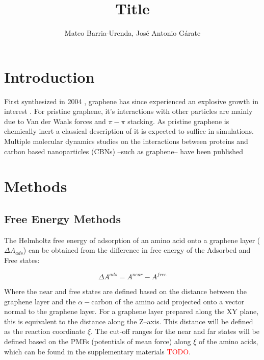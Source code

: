 \documentclass[twoside,twocolumn,9pt]{article}
\author{Mateo Barria-Urenda, José Antonio Gárate}
\title{Title}
\date{}
\begin{document}
\maketitle

\abstract{}

\section{Introduction}


First synthesized in 2004 \cite{Novoselov_2004}, graphene has since
experienced an explosive growth in interest \cite{Randviir_2014}.  For
pristine graphene, it's interactions with other particles are mainly
due to Van der Waals forces and $\pi-\pi$ stacking. \cite{Zuo_2012} As
pristine graphene is chemically inert \cite{Eftekhari_2017} a
classical description of it is expected to suffice in simulations.
Multiple molecular dynamics studies on the interactions between
proteins and carbon based nanoparticles (CBNs) --such as graphene--
have been published \cite{Zheng_2003, Ge_2011, Zuo_2012, Chong_2015,
  Duan_2015, Shityakov_2015, Al_Qattan_2018,Puigpelat_2019,
  Gonz_lez_Durruthy_2020, Li_2020}





\section{Methods}

\subsection{Free Energy Methods}

The Helmholtz free energy of adsorption of an amino acid onto a
graphene layer ($\Delta A_{ads}$) can be obtained from the difference
in free energy of the Adsorbed and Free states:

\begin{equation}
\label{eq:Adsorption}
\Delta A^{ads} = A^{near} - A^{free}
\end{equation}

Where the near and free states are defined based on the
distance between the graphene layer and the $\alpha-$carbon of the
amino acid projected onto a vector normal to the graphene layer. For a
graphene layer prepared along the XY plane, this is equivalent to the
distance along the Z--axis. This distance will be defined as the
reaction coordinate $\xi$. The cut-off ranges for the near and far
states will be defined based on the PMFs (potentials of mean force)
along $\xi$ of the amino acids, which can be found in the
supplementary materials \textcolor{red}{TODO}.
\end{document}
